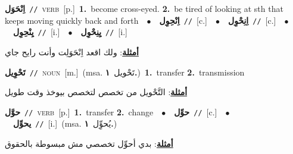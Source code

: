 \documentclass[10pt,a4paper,twoside]{article} %
\begin{document}
\begin{multicols}{2}
{\setlength\topsep{0pt}\textbf{\foreignlanguage{arabic}{اِنْحَوَل}}\ {\color{gray}\texttt{//}\color{black}}\ \textsc{verb}\ [p.]\ \textbf{1.}~become cross-eyed.  \textbf{2.}~be tired of looking at sth that keeps moving quickly back and forth\ \ $\bullet$\ \ \setlength\topsep{0pt}\textbf{\foreignlanguage{arabic}{اِنْحِوِل}}\ {\color{gray}\texttt{//}\color{black}}\ [c.]\ \ $\bullet$\ \ \setlength\topsep{0pt}\textbf{\foreignlanguage{arabic}{اِنِحْوِل}}\ {\color{gray}\texttt{//}\color{black}}\ [c.]\ \ $\bullet$\ \ \setlength\topsep{0pt}\textbf{\foreignlanguage{arabic}{يِنْحِوِل}}\ {\color{gray}\texttt{//}\color{black}}\ [i.]\ \ $\bullet$\ \ \setlength\topsep{0pt}\textbf{\foreignlanguage{arabic}{يِنِحْوِل}}\ {\color{gray}\texttt{//}\color{black}}\ [i.]\  \begin{flushright}\color{gray}\foreignlanguage{arabic}{\textbf{\underline{\foreignlanguage{arabic}{أمثلة}}}: ولك اقعد اِنْحَوَلِت وأنت رايح جاي}\end{flushright}\color{black}} \vspace{2mm}

{\setlength\topsep{0pt}\textbf{\foreignlanguage{arabic}{تَحْوِيل}}\ {\color{gray}\texttt{//}\color{black}}\ \textsc{noun}\ [m.]\ \color{gray}(msa. \foreignlanguage{arabic}{تَحْويل}~\foreignlanguage{arabic}{\textbf{١.}})\color{black}\ \textbf{1.}~transfer  \textbf{2.}~transmission\  \begin{flushright}\color{gray}\foreignlanguage{arabic}{\textbf{\underline{\foreignlanguage{arabic}{أمثلة}}}: التَّحْويل من تخصص لتخصص بيوخذ وقت طويل}\end{flushright}\color{black}} \vspace{2mm}

{\setlength\topsep{0pt}\textbf{\foreignlanguage{arabic}{حوَّل}}\ {\color{gray}\texttt{//}\color{black}}\ \textsc{verb}\ [p.]\ \textbf{1.}~transfer  \textbf{2.}~change\ \ $\bullet$\ \ \setlength\topsep{0pt}\textbf{\foreignlanguage{arabic}{حوِّل}}\ {\color{gray}\texttt{//}\color{black}}\ [c.]\ \ $\bullet$\ \ \setlength\topsep{0pt}\textbf{\foreignlanguage{arabic}{يحوِّل}}\ {\color{gray}\texttt{//}\color{black}}\ [i.]\ \color{gray}(msa. \foreignlanguage{arabic}{يُحوِِّل}~\foreignlanguage{arabic}{\textbf{١.}})\color{black}\  \begin{flushright}\color{gray}\foreignlanguage{arabic}{\textbf{\underline{\foreignlanguage{arabic}{أمثلة}}}: بدي أحوِّل تخصصي مش مبسوطة بالحقوق}\end{flushright}\color{black}} \vspace{2mm}


\end{multicols}
\end{document}
